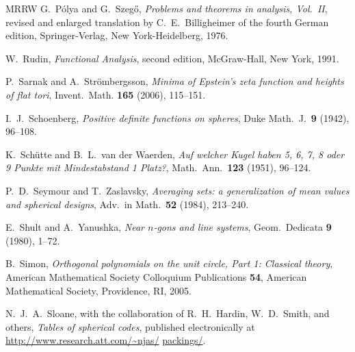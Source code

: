 \documentclass{jams-l}
\theoremstyle{plain}
\numberwithin{theorem}{section}
\theoremstyle{definition}
\numberwithin{equation}{section}
\begin{document}
\begin{thebibliography}{MRRW}
G.~P\'olya and G.~Szeg\H o, \textit{Problems and theorems in
analysis, Vol.~II\/}, revised and enlarged translation by
C.~E.~Billigheimer of the fourth German edition, Springer-Verlag,
New York-Heidelberg, 1976. 

 W.~Rudin, \textit{Functional Analysis\/}, second edition,
McGraw-Hall, New York, 1991.

 P.~Sarnak and A.~Str\"ombergsson, \textit{Minima of
Epstein's zeta function and heights of flat tori\/}, Invent.\
Math. \textbf{165} (2006), 115--151.

 I.~J.~Schoenberg, \textit{Positive definite functions
on spheres\/}, Duke Math.\ J.\ {\bf 9} (1942), 96--108.

 K.~Sch\"utte and B.~L.~van der Waerden,
\textit{Auf welcher Kugel haben 5, 6, 7, 8 oder 9 Punkte mit
Mindestabstand 1 Platz?\/}, Math.\ Ann.\ {\bf 123} (1951),
96--124.

 P.~D.~Seymour and T.~Zaslavsky,
\textit{Averaging sets: a generalization of mean values and
spherical designs\/}, Adv.\ in Math.\ \textbf{52} (1984),
213--240. 

 E.~Shult and A.~Yanushka,
\textit{Near $n$-gons and line systems\/},
Geom.\ Dedicata \textbf{9} (1980), 1--72.

B.~Simon, \textit{Orthogonal polynomials on the unit circle, Part
1: Classical theory\/}, American Mathematical Society Colloquium
Publications \textbf{54}, American Mathematical Society,
Providence, RI, 2005. 

 N.~J.~A.~Sloane, with the collaboration of R.~H.~Hardin,
W.~D.~Smith, and others, \textit{Tables of spherical codes\/},
published electronically at \url{http://www.research.att.com/~njas/}
\url{packings/}.



\end{thebibliography}
\end{document}
